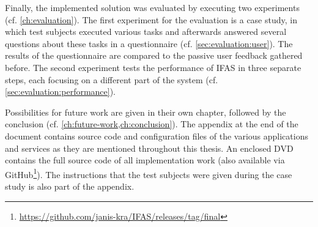 Finally, the implemented solution was evaluated by executing two experiments (cf. \cref{ch:evaluation}).
The first experiment for the evaluation is a case study, in which test subjects executed various tasks and afterwards answered several questions about these tasks in a questionnaire (cf. \cref{sec:evaluation:user}).
The results of the questionnaire are compared to the passive user feedback gathered before.
The second experiment tests the performance of \ac{IFAS} in three separate steps, each focusing on a different part of the system (cf. \cref{sec:evaluation:performance}).

Possibilities for future work are given in their own chapter, followed by the conclusion (cf. \cref{ch:future-work,ch:conclusion}).
The appendix at the end of the document contains source code and configuration files of the various applications and services as they are mentioned throughout this thesis.
An enclosed DVD contains the full source code of all implementation work (also available via GitHub\footnote{\url{https://github.com/janis-kra/IFAS/releases/tag/final}}).
The instructions that the test subjects were given during the case study is also part of the appendix.
